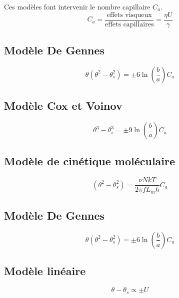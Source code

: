 \documentclass[french]{article}
\begin{document}
Ces modèles font intervenir le nombre capillaire $C_{a}$.
\begin{equation}
	C_{a} 
	= \frac{\text{effets visqueux}}{\text{effets capillaires}} 
	= \frac{\eta U}{\gamma}
\end{equation}
\subsection*{Modèle De Gennes} 

\begin{equation}
	\label{modele:gennes}
	\theta 
	\left(\theta^{2} - \theta_{s}^{2}\right) 
	= \pm 6\ln\left(\frac{b}{a}\right)C_{a}
\end{equation}
\subsection*{Modèle Cox et Voinov}  

\begin{equation}
	\label{modele:Cox}
	\theta^{3} - \theta_{s}^{3} = 
	\pm 
	9\ln\left(
	\frac{b}{a}\right) C_{a}
\end{equation}
\subsection*{Modèle de cinétique moléculaire}  

\begin{equation}
	\left(\theta^{2} - \theta_{s}^{2}\right) 
	= \frac{\nu NkT}{2\pi fL_{m}h}C_{a}
\end{equation}
\subsection*{Modèle De Gennes}

\begin{equation}
	\theta 
	\left(\theta^{2} - \theta_{s}^{2}\right) 
	= \pm 6\ln\left(\frac{b}{a}\right)C_{a}
\end{equation}
\subsection*{Modèle linéaire} 

\begin{equation}
	\theta - \theta_{s} \propto \pm U
\end{equation}
\end{document}

